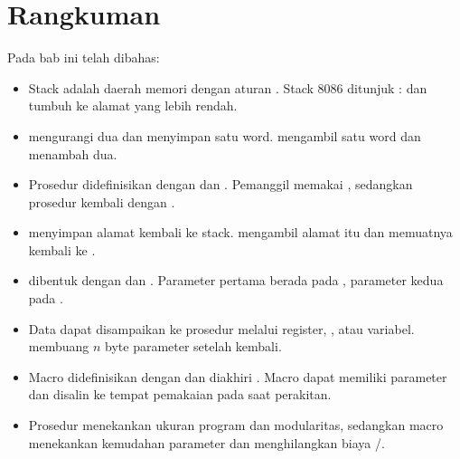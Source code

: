 \section{Rangkuman}
\label{sec:rangkuman-bab14}

Pada bab ini telah dibahas:

\begin{itemize}
    \item Stack adalah daerah memori dengan aturan . Stack 8086 ditunjuk : dan
          tumbuh ke alamat yang lebih rendah.

    \item {} mengurangi  dua dan menyimpan satu word.
           mengambil satu word dan menambah  dua.

    \item Prosedur didefinisikan dengan  dan .
          Pemanggil memakai , sedangkan prosedur kembali
          dengan .

    \item {} menyimpan alamat kembali ke stack. 
          mengambil alamat itu dan memuatnya kembali ke .

    \item {} dibentuk dengan  dan
          . Parameter pertama berada pada
          \code{[BP+4]}, parameter kedua pada \code{[BP+6]}.

    \item Data dapat disampaikan ke prosedur melalui register,
          , atau variabel.   membuang
          $n$ byte parameter setelah kembali.

    \item Macro didefinisikan dengan  dan diakhiri
          . Macro dapat memiliki parameter dan disalin ke
          tempat pemakaian pada saat perakitan.

    \item Prosedur menekankan ukuran program dan modularitas,
          sedangkan macro menekankan kemudahan parameter dan
          menghilangkan biaya /.
\end{itemize}

